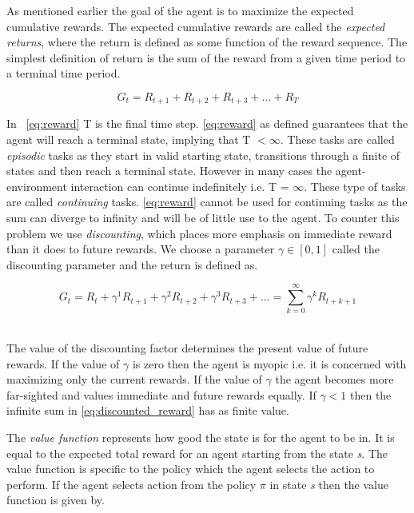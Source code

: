 As mentioned earlier the goal of the agent is to maximize the expected cumulative rewards. The expected cumulative rewards are called the \emph{expected returns}, where the return is defined as some function of the reward sequence. The simplest definition of return is the sum of the reward from a given time period to a terminal time period.

\begin{equation}\label{eq:reward}
G_t = R_{t+1} + R_{t+2} + R_{t+3} + \dots + R_{T}
\end{equation}

In ~\ref{eq:reward} T is the final time step. \ref{eq:reward} as defined guarantees that the agent will reach a terminal state, implying that T $< \infty$. These tasks are called \emph{episodic} tasks as they start in valid starting state, transitions through a finite of states and then reach a terminal state. However in many cases the agent-environment interaction can continue indefinitely i.e. T = $\infty$. These type of tasks are called \emph{continuing} tasks. \ref{eq:reward} cannot be used for continuing tasks as the sum can diverge to infinity and will be of little use to the agent. To counter this problem we use \emph{discounting}, which places more emphasis on immediate reward than it does to future rewards. We choose a parameter $\gamma \in [0,1]$ called the discounting parameter and the return is defined as.


\begin{equation}\label{eq:discounted_reward}
G_t  = R_t + \gamma^1 R_{t+1} + \gamma^2 R_{t+2} + \gamma^3 R_{t+3} + \dots = \sum_{k=0}^{\infty} \gamma^kR_{t+k+1}
\end{equation}\

The value of the discounting factor determines the present value of future rewards. If the value of $\gamma$ is zero then the agent is myopic i.e. it is concerned with maximizing only the current rewards. If the value of $\gamma$ the agent becomes more far-sighted and values immediate and future rewards equally. If $\gamma < 1$ then the infinite sum in \ref{eq:discounted_reward} has as finite value.



The \emph{value function} represents how good the state is for the agent to be in. It is equal to the expected total reward for an agent starting from the state \emph{s}. The value function is specific to the policy which the agent selects the action to perform. If the agent selects action from the policy $\pi$ in state \emph{s} then the value function is given by.


